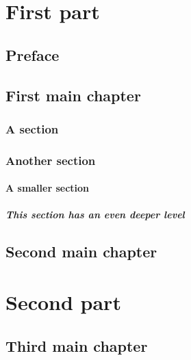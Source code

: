 \documentclass{book}
\begin{document}
\tableofcontents{}
\part{First part}

\chapter*{Preface}              %




\chapter{First main chapter}

\section{A section}

\section{Another section}

\subsection{A smaller section}

\subsubsection[Deeper level]{This section has an even deeper level} %

\chapter{Second main chapter}

\part{Second part}

\chapter{Third main chapter}
\end{document}
